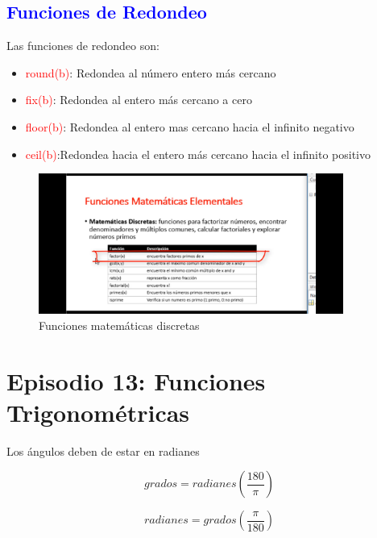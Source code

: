\documentclass{article}
\begin{document}
	\subsection{\textcolor{blue}{Funciones de Redondeo}}
	
	Las funciones de redondeo son:
	
	\begin{itemize}
		\item \textcolor{red}{round(b)}: Redondea al número entero más cercano
		\item \textcolor{red}{fix(b)}: Redondea al entero más cercano a cero
		\item \textcolor{red}{floor(b)}: Redondea al entero mas cercano hacia el infinito negativo
		\item \textcolor{red}{ceil(b)}:Redondea hacia el entero más cercano hacia el infinito positivo
	\end{itemize}

	\begin{figure}[h!]
		\centering
		\includegraphics[width = 100mm]{imagenes/math_discre}
		\caption{Funciones matemáticas discretas}
		\label{discretas}
	\end{figure}

	\section{Episodio 13: Funciones Trigonométricas}

	Los ángulos deben de estar en radianes
	
	\begin{equation}
	grados = radianes \left(\frac{180}{\pi}\right)
	\end{equation}
	
	\begin{equation}
	radianes = grados \left(\frac{\pi}{180}\right)
	\end{equation}
	
\end{document}
